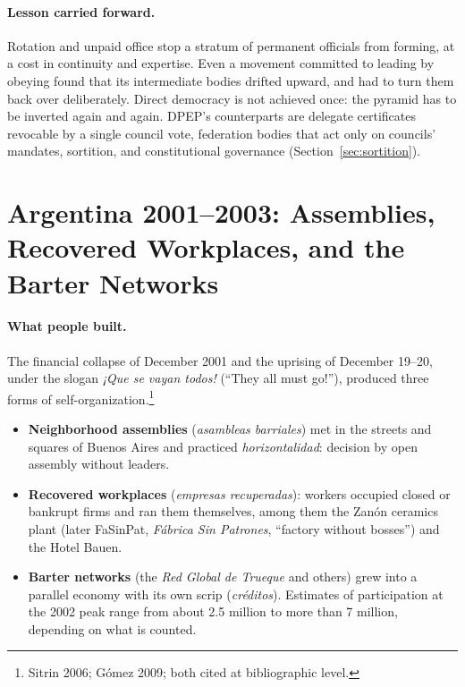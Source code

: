 \documentclass[10pt,twoside,openany]{book}
\theoremstyle{dpepstyle}
\begin{document}
\paragraph{Lesson carried forward.} Rotation and unpaid office stop a stratum of permanent officials from forming, at a cost in continuity and expertise. Even a movement committed to leading by obeying found that its intermediate bodies drifted upward, and had to turn them back over deliberately. Direct democracy is not achieved once: the pyramid has to be inverted again and again. DPEP's counterparts are delegate certificates revocable by a single council vote, federation bodies that act only on councils' mandates, sortition, and constitutional governance (Section~\ref{sec:sortition}).

\section{Argentina 2001--2003: Assemblies, Recovered Workplaces, and the Barter Networks}
\label{sec:hist-argentina}

\paragraph{What people built.} The financial collapse of December 2001 and the uprising of December 19--20, under the slogan \emph{¡Que se vayan todos!} (``They all must go!''), produced three forms of self-organization.\footnote{Sitrin 2006; G\'omez 2009; both cited at bibliographic level.}
\begin{itemize}[leftmargin=1.6em,itemsep=2pt]
  \item \textbf{Neighborhood assemblies} (\emph{asambleas barriales}) met in the streets and squares of Buenos Aires and practiced \emph{horizontalidad}: decision by open assembly without leaders.
  \item \textbf{Recovered workplaces} (\emph{empresas recuperadas}): workers occupied closed or bankrupt firms and ran them themselves, among them the Zan\'on ceramics plant (later FaSinPat, \emph{F\'abrica Sin Patrones}, ``factory without bosses'') and the Hotel Bauen.
  \item \textbf{Barter networks} (the \emph{Red Global de Trueque} and others) grew into a parallel economy with its own scrip (\emph{cr\'editos}). Estimates of participation at the 2002 peak range from about 2.5 million to more than 7 million, depending on what is counted.
\end{itemize}
\end{document}
